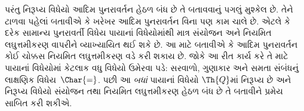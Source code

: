 \documentclass[../../../include/open-logic-section]{subfiles}
\begin{document}
પરંતુ નિરૂપ્ય વિધેયો આદિમ
પુનરાવર્તન હેઠળ બંધ છે તે બતાવવાનું
પગલું મુશ્કેલ છે. તેને ટાળવા
પહેલાં બતાવીએ કે ખરેખર આદિમ
પુનરાવર્તન વિના પણ કામ ચાલે છે.
એટલે કે દરેક સામાન્ય પુનરાવર્તી
વિધેય પાયાનાં વિધેયોમાંથી માત્ર
સંયોજન અને નિયમિત લઘુત્તમીકરણ
વાપરીને વ્યાખ્યાયિત થઈ શકે છે.
આ માટે બતાવીએ કે આદિમ પુનરાવર્તન
કોઈ ચોક્કસ નિયમિત લઘુત્તમીકરણ
વડે કરી શકાય છે. જોકે આ રીત
કાર્ય કરે તે માટે પાયાનાં વિધેયોમાં
કેટલાક વધુ વિધેયો ઉમેરવા પડે:
સરવાળો, ગુણાકાર અને સમતા
સંબંધનું લાક્ષણિક વિધેય~$\Char{=}$.
પછી આ \emph{બધાં} પાયાનાં વિધેયો
$\Th{Q}$માં નિરૂપ્ય છે અને નિરૂપ્ય
વિધેયો સંયોજન તથા નિયમિત
લઘુત્તમીકરણ હેઠળ બંધ છે તે
બતાવીને પ્રમેય સાબિત કરી શકીએ.
\end{document}
